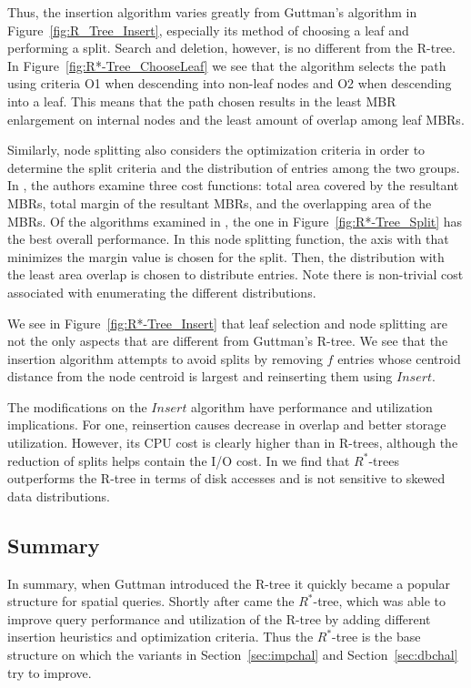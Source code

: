 Thus, the insertion algorithm varies greatly from Guttman's algorithm in 
Figure~\ref{fig:R_Tree_Insert}, especially its method of choosing a leaf and performing a 
split. Search and deletion, however, is no different from the R-tree. In 
Figure~\ref{fig:R*-Tree_ChooseLeaf} we see that the algorithm selects the path using criteria
O1 when descending into non-leaf nodes and O2 when descending into a leaf. This means that
the path chosen results in the least MBR enlargement on internal nodes and the least 
amount of overlap among leaf MBRs. 

Similarly, node splitting also considers the optimization criteria in order to determine
the split criteria and the distribution of entries among the two groups. In 
\cite{beckmannkriegelschneiderseeger90}, the authors examine three cost functions: total area 
covered by the resultant MBRs, total margin of the resultant MBRs, and the overlapping area 
of the MBRs. Of the algorithms examined in \cite{beckmannkriegelschneiderseeger90}, the one in 
Figure~\ref{fig:R*-Tree_Split} has the best overall performance. In this node splitting 
function, the axis with that minimizes the margin value is chosen for the split. Then, the 
distribution with the least area overlap is chosen to distribute entries. Note there is 
non-trivial cost associated with enumerating the different distributions.

We see in Figure~\ref{fig:R*-Tree_Insert} that leaf selection and node splitting are not
the only aspects that are different from Guttman's R-tree. We see that the insertion 
algorithm attempts to avoid splits by removing $f$ entries whose centroid distance from 
the node centroid is largest and reinserting them using $Insert$. 
 
The modifications on the $Insert$ algorithm have performance and utilization implications. 
For one, reinsertion causes decrease in overlap and better storage utilization. However,
its CPU cost is clearly higher than in R-trees, although the reduction of splits helps 
contain the I/O cost. In \cite{beckmannkriegelschneiderseeger90} we find that $R^{*}$-trees 
outperforms the R-tree in terms of disk accesses and is not sensitive to skewed data distributions. 

\subsection{Summary}
In summary, when Guttman introduced the R-tree it quickly became a popular structure
for spatial queries. Shortly after came the $R^{*}$-tree, which was able to improve query 
performance and utilization of the R-tree by adding different insertion heuristics and 
optimization criteria. Thus the $R^{*}$-tree is the base structure on which the variants 
in Section~\ref{sec:impchal} and Section~\ref{sec:dbchal} try to improve.
